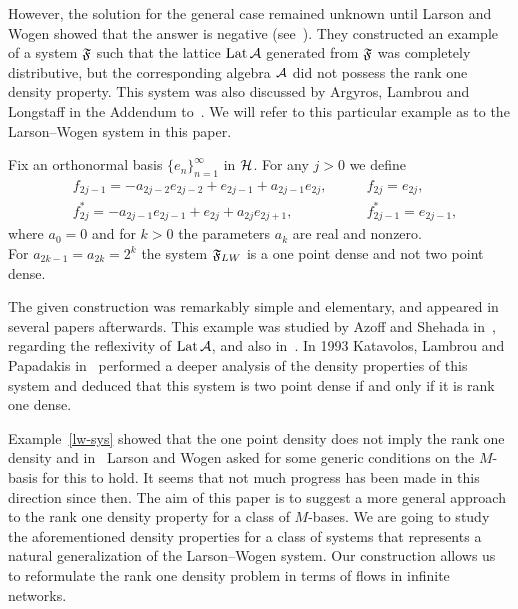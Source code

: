 \documentclass[12pt,oneside,a4paper]{amsart}
\begin{document}
  However, the solution for the general case remained unknown until Larson and Wogen showed that the answer is negative (see~\cite{larson}).
  They constructed an example of a system $\fsys$ such that the lattice $\lattice$ generated from $\fsys$
    was completely distributive, but the corresponding algebra $\cal{A}$
    did not possess the rank one density property.
  This system was also discussed by Argyros, Lambrou and Longstaff in the Addendum to~\cite{argyroslambrou}.
  We will refer to this particular example as to the Larson--Wogen system in this paper.
  \begin{example}
    \label{lw-sys}
    Fix an orthonormal basis $\{e_n\}_{n=1}^\infty$ in $\cal{H}$. For any $j > 0$ we define
    \begin{align*}
      &f_{2j-1}=-a_{2j-2}e_{2j-2} + e_{2j-1} + a_{2j-1}e_{2j}, \qquad &f_{2j}=e_{2j},\\
      &f^*_{2j}=-a_{2j-1}e_{2j-1}+e_{2j}+a_{2j}e_{2j+1}, \qquad &f^*_{2j-1}=e_{2j-1},
    \end{align*}
    where $a_0 = 0$ and for $k > 0$ the parameters $a_k$ are real and nonzero.\\
    For $a_{2k-1}= a_{2k} = 2^k$ the system $\fsys_{LW}$ is a one point dense and not two point dense.
  \end{example}
  The given construction was remarkably simple and elementary, and appeared in several papers afterwards.
  This example was studied by Azoff and Shehada in~\cite{azoff}, regarding the reflexivity of $\lattice$, and also in~\cite{me}.
  In 1993 Katavolos, Lambrou and Papadakis in~\cite{katavolos} performed a deeper analysis of the density properties
    of this system and deduced that this system is two point dense if and only if it is rank one dense.

  Example~\ref{lw-sys} showed that the one point density does not imply the rank one density and
    in~\cite{larson} Larson and Wogen asked for some generic conditions on the $M$-basis
    for this to hold.
  It seems that not much progress has been made in this direction since then.
  The aim of this paper is to suggest a more general approach to the rank one density property
    for a class of $M$-bases.
  We are going to study the aforementioned density properties for a class of systems that represents a natural generalization of the Larson--Wogen system.
  Our construction allows us to reformulate the rank one density problem in terms of flows in infinite networks.
\end{document}
